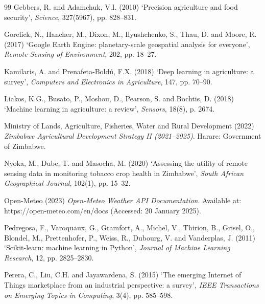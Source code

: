 \documentclass[12pt,a4paper]{report}
\begin{document}
\begin{thebibliography}{99}
Gebbers, R. and Adamchuk, V.I. (2010) `Precision agriculture and food security', \textit{Science}, 327(5967), pp. 828--831.

Gorelick, N., Hancher, M., Dixon, M., Ilyushchenko, S., Thau, D. and Moore, R. (2017) `Google Earth Engine: planetary-scale geospatial analysis for everyone', \textit{Remote Sensing of Environment}, 202, pp. 18--27.

Kamilaris, A. and Prenafeta-Boldú, F.X. (2018) `Deep learning in agriculture: a survey', \textit{Computers and Electronics in Agriculture}, 147, pp. 70--90.

Liakos, K.G., Busato, P., Moshou, D., Pearson, S. and Bochtis, D. (2018) `Machine learning in agriculture: a review', \textit{Sensors}, 18(8), p. 2674.

Ministry of Lands, Agriculture, Fisheries, Water and Rural Development (2022) \textit{Zimbabwe Agricultural Development Strategy II (2021--2025)}. Harare: Government of Zimbabwe.

Nyoka, M., Dube, T. and Masocha, M. (2020) `Assessing the utility of remote sensing data in monitoring tobacco crop health in Zimbabwe', \textit{South African Geographical Journal}, 102(1), pp. 15--32.

Open-Meteo (2023) \textit{Open-Meteo Weather API Documentation}. Available at: https://open-meteo.com/en/docs (Accessed: 20 January 2025).

Pedregosa, F., Varoquaux, G., Gramfort, A., Michel, V., Thirion, B., Grisel, O., Blondel, M., Prettenhofer, P., Weiss, R., Dubourg, V. and Vanderplas, J. (2011) `Scikit-learn: machine learning in Python', \textit{Journal of Machine Learning Research}, 12, pp. 2825--2830.

Perera, C., Liu, C.H. and Jayawardena, S. (2015) `The emerging Internet of Things marketplace from an industrial perspective: a survey', \textit{IEEE Transactions on Emerging Topics in Computing}, 3(4), pp. 585--598.


\end{thebibliography}
\end{document}
